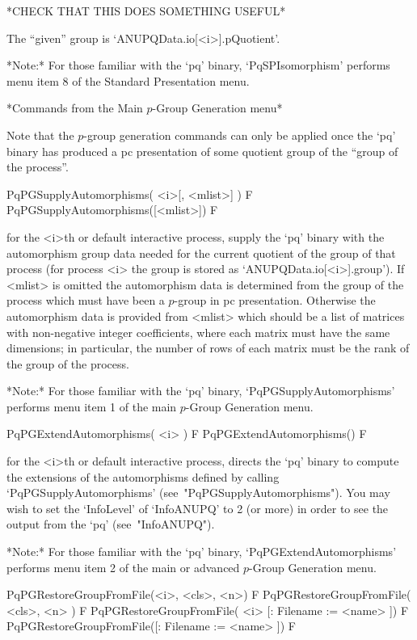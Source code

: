 *CHECK THAT THIS DOES SOMETHING USEFUL*

The ``given'' group is `ANUPQData.io[<i>].pQuotient'.

*Note:* For  those  familiar  with  the  `pq'  binary,  `PqSPIsomorphism'
performs menu item 8 of the Standard Presentation menu.

*Commands from the Main $p$-Group Generation menu*

Note that the $p$-group generation commands can only be applied once  the
`pq' binary has produced a pc presentation of some quotient group of  the
``group of the process''.

\>PqPGSupplyAutomorphisms( <i>[, <mlist>] ) F
\>PqPGSupplyAutomorphisms([<mlist>]) F

for the <i>th or default interactive {\ANUPQ} process,  supply  the  `pq'
binary with the automorphism group data needed for the  current  quotient
of the group of that process (for process <i>  the  group  is  stored  as
`ANUPQData.io[<i>].group'). If <mlist> is omitted the  automorphism  data
is determined from the group of  the  process  which  must  have  been  a
$p$-group in pc presentation. Otherwise the automorphism data is provided
from <mlist> which should be a list of matrices with non-negative integer
coefficients, where  each  matrix  must  have  the  same  dimensions;  in
particular, the number of rows of each matrix must be  the  rank  of  the
group of the process.

*Note:*
For  those  familiar  with  the  `pq'  binary,  `PqPGSupplyAutomorphisms'
performs menu item 1 of the main $p$-Group Generation menu.

\>PqPGExtendAutomorphisms( <i> ) F
\>PqPGExtendAutomorphisms() F

for the <i>th or default interactive {\ANUPQ} process, directs  the  `pq'
binary to compute the extensions of the automorphisms defined by  calling
`PqPGSupplyAutomorphisms' (see~"PqPGSupplyAutomorphisms"). You  may  wish
to set the `InfoLevel' of `InfoANUPQ' to 2 (or more) in order to see  the
output from the `pq' (see~"InfoANUPQ").

*Note:*    
For  those  familiar  with  the  `pq'  binary,  `PqPGExtendAutomorphisms'
performs menu item 2 of the main or advanced $p$-Group Generation menu. 

\>PqPGRestoreGroupFromFile(<i>, <cls>, <n>) F
\>PqPGRestoreGroupFromFile( <cls>, <n> ) F
\>PqPGRestoreGroupFromFile( <i> [: Filename := <name> ]) F
\>PqPGRestoreGroupFromFile([: Filename := <name> ]) F

